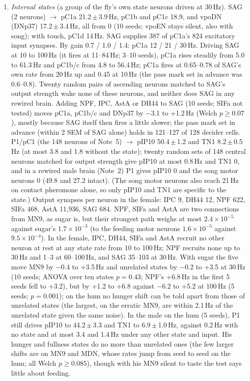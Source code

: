 \documentclass[11pt,a4paper]{article}
\begin{document}
\begin{enumerate}[leftmargin=*, label=\arabic*., itemsep=4pt]
\item \emph{Internal states} (a group of the fly's own state neurons driven at 30\,Hz). SAG (2 neurons) $\rightarrow$ pC1a 21.2\,$\pm$\,3.9\,Hz, pC1b and pC1c 18.9, and vpoDN (DNp37) 17.2\,$\pm$\,3.4\,Hz, all from 0 (10 seeds; vpoEN stays silent, also with song); with touch, pC1d 14\,Hz. SAG supplies 387 of pC1a's 824 excitatory input synapses. By gain 0.7 / 1.0 / 1.4: pC1a 12 / 21 / 30\,Hz. Driving SAG at 10 to 100\,Hz (it fires at 11--84\,Hz; 3--10 seeds), pC1a rises steadily from 5.0 to 61.3\,Hz and pC1b/c from 4.8 to 56.4\,Hz; pC1a fires at 0.65--0.78 of SAG's own rate from 20\,Hz up and 0.45 at 10\,Hz (the pass mark set in advance was 0.6--0.8). Twenty random pairs of ascending neurons matched to SAG's output strength wake none of these neurons, and neither does SAG in any rewired brain. Adding NPF, IPC, AstA or DH44 to SAG (10 seeds; SIFa not tested) moves pC1a, pC1b/c and DNp37 by $-$3.1 to +1.2\,Hz (Welch $p\geq0.07$), mostly because SAG itself then fires a little slower; the pass mark set in advance (within 2 SEM of SAG alone) holds in 121--127 of 128 decider cells. P1/pC1 (the 148 neurons of Note~5) $\rightarrow$ pIP10 50.4\,$\pm$\,1.2 and TN1 8.2\,$\pm$\,0.5\,Hz (at most 3.8 and 1.8 without the state); twenty random sets of 148 central neurons matched for output strength give pIP10 at most 0.8\,Hz and TN1 0, and in a rewired male brain (Note~2) P1 gives pIP10 0 and the song motor neurons 0 (49.8 and 27.2 intact). (The song motor neurons also reach 21\,Hz on contact pheromone alone, so only pIP10 and TN1 are specific to the state.) Output synapses per neuron in the female: IPC 9, DH44 12, NPF 622, SIFa 468, AstA 11{,}936, SAG 684. NPF, SIFa and AstA are two connections from MN9, as sugar is, but their strongest path weighs at most $2.4\times10^{-5}$ against sugar's $1.7\times10^{-3}$ (to the feeding motor neurons $1.6\times10^{-5}$ against $9.5\times10^{-4}$). In the female, IPC, DH44, SIFa and AstA recruit no other neuron at rest at any state rate from 10 to 100\,Hz; NPF recruits none up to 30\,Hz and 1--3 at 60--100\,Hz, and SAG 35--103 at 30\,Hz. With sugar the five move MN9 by $-$0.4 to +3.5\,Hz and unrelated states by $-$0.2 to +3.5 at 30\,Hz (10 seeds; ANOVA over ten states $p=0.43$; NPF's +6.8\,Hz in the first 5 seeds fell to +3.2), but by +1.2 to +6.8 against $-$6.2 to +5.2 at 100\,Hz (5 seeds; $p=0.001$); on the hum no hunger shift can be told apart from those of unrelated states (the largest, on the erratic MN9, are within 2.1\,Hz of the unrelated state given the same noise). In the male on the hum (5 seeds), P1 still drives pIP10 to 44.2\,$\pm$\,3.3 and TN1 to 6.9\,$\pm$\,1.0\,Hz, against 0.2\,Hz with no state and at most 3.4 and 1.4\,Hz under any other state and input. His hunger and fullness states do no more than unrelated ones (the few larger shifts are on MN9 and MDN, whose rates jump from seed to seed on the hum; all Welch $p\geq0.085$), though with his MN9 silent to taste the test says little about feeding.

\end{enumerate}
\end{document}

